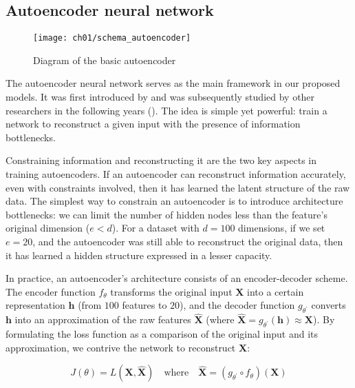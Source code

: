 \subsection{Autoencoder neural network}

\begin{wrapfigure}{r}{0.5\textwidth}
  \centering
  \texttt{[image: ch01/schema\_autoencoder]}
  \caption[Diagram of the basic autoencoder]{
      Diagram of the basic autoencoder
  }
  \label{schema:autoencoder}
\end{wrapfigure}

\par The autoencoder neural network serves as the main framework in our
proposed models.  It was first introduced by \cite{lecun1987phd} and
was subsequently studied by other researchers in the following years
(\cite{bourlard1988auto, hinton1994autoencoders}). The idea is simple yet
powerful: train a network to reconstruct a given input with the
presence of information bottlenecks.

\par Constraining information and reconstructing it are the two key aspects in
training autoencoders. If an autoencoder can reconstruct information
accurately, even with constraints involved, then it has learned the latent
structure of the raw data. The simplest way to constrain an autoencoder is to
introduce architecture bottlenecks: we can limit the number of hidden nodes
less than the feature's original dimension ($e<d$). For a dataset with
$d=100$ dimensions, if we set $e=20$, and the autoencoder was still able to
reconstruct the original data, then it has learned a hidden structure expressed
in a lesser capacity.

\par In practice, an autoencoder's architecture consists of an encoder-decoder
scheme. The encoder function $f_{\theta}$ transforms the original input
$\mathbf{X}$ into a certain representation $\mathbf{h}$ (from $100$ features to
$20$), and the decoder function $g_{\theta^{\prime}}$ converts $\mathbf{h}$
into an approximation of the raw features $\mathbf{\widehat{X}}$ (where
$\mathbf{\widehat{X}} = g_{\theta^{\prime}}(\mathbf{h}) \approx \mathbf{X}$).
By formulating the loss function as a comparison of the original input and its
approximation, we  contrive the network to reconstruct $\mathbf{X}$:

\[
    J(\theta) = L(\mathbf{X}, \mathbf{\widehat{X}}) \quad \text{where} \quad
    \mathbf{\widehat{X}} = (g_{\theta^{\prime}} \circ f_{\theta}) (\mathbf{X})
\]

